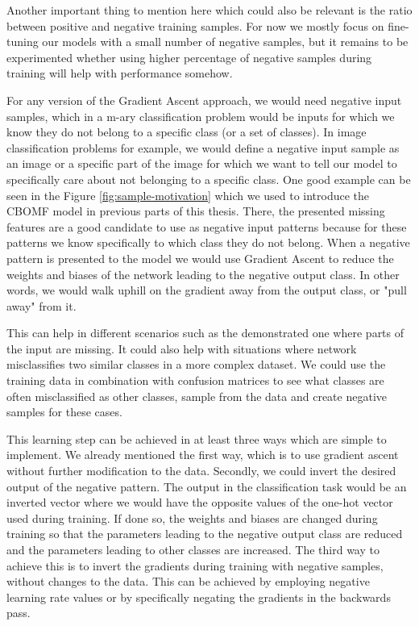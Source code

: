 \documentclass[b5paper]{book}
\begin{document}
Another important thing to mention here which could also be relevant is the ratio between positive and negative training samples. For now we mostly focus on fine-tuning our models with a small number of negative samples, but it remains to be experimented whether using higher percentage of negative samples during training will help with performance somehow.

For any version of the Gradient Ascent approach, we would need negative input samples, which in a m-ary classification problem would be inputs for which we know they do not belong to a specific class (or a set of classes). In image classification problems for example, we would define a negative input sample as an image or a specific part of the image for which we want to tell our model to specifically care about not belonging to a specific class. One good example can be seen in the Figure \ref{fig:sample-motivation} which we used to introduce the CBOMF model in previous parts of this thesis. There, the presented missing features are a good candidate to use as negative input patterns because for these patterns we know specifically to which class they do not belong. When a negative pattern is presented to the model we would use Gradient Ascent to reduce the weights and biases of the network leading to the negative output class. In other words, we would walk uphill on the gradient away from the output class, or "pull away" from it. 

This can help in different scenarios such as the demonstrated one where parts of the input are missing. It could also help with situations where network misclassifies two similar classes in a more complex dataset. We could use the training data in combination with confusion matrices to see what classes are often misclassified as other classes, sample from the data and create negative samples for these cases.

This learning step can be achieved in at least three ways which are simple to implement. We already mentioned the first way, which is to use gradient ascent without further modification to the data. Secondly, we could invert the desired output of the negative pattern. The output in the classification task would be an inverted vector where we would have the opposite values of the one-hot vector used during training. If done so, the weights and biases are changed during training so that the parameters leading to the negative output class are reduced and the parameters leading to other classes are increased. The third way to achieve this is to invert the gradients during training with negative samples, without changes to the data. This can be achieved by employing negative learning rate values or by specifically negating the gradients in the backwards pass.
\end{document}
